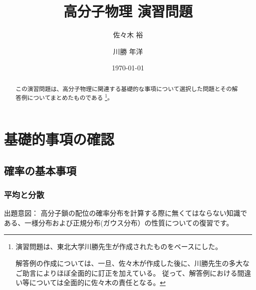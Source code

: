 \documentclass[uplatex,dvipdfmx,a4paper,11pt]{jsarticle}
\title{高分子物理 演習問題}
\author{佐々木 裕 \and 川勝 年洋}
\date{\today}
\begin{document}
\maketitle

\begin{abstract}

この演習問題は、高分子物理に関連する基礎的な事項について選択した問題とその解答例についてまとめたものである
\footnote
{
演習問題は、東北大学川勝先生が作成されたものをベースにした。

解答例の作成については、一旦、佐々木が作成した後に、川勝先生の多大なご助言によりほぼ全面的に訂正を加えている。
従って、解答例における間違い等については全面的に佐々木の責任となる。
}。

\end{abstract}

\setcounter{tocdepth}{4}
\tableofcontents
\newpage

\setcounter{secnumdepth}{4}
\newpage

\section{基礎的事項の確認}

\subsection{確率の基本事項}

\subsubsection{平均と分散}

\begin{boxnote}
出題意図： 高分子鎖の配位の確率分布を計算する際に無くてはならない知識である、一様分布および正規分布(ガウス分布）の性質についての復習です。 
\end{boxnote}

\vspace{10pt}
\end{document}
